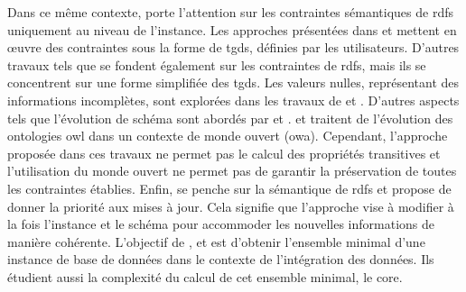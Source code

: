 Dans ce même contexte, \cite{goasdoueEfficientQueryAnswering2013} porte l'attention sur les contraintes sémantiques de \gls{rdfs} uniquement au niveau de l'instance.
Les approches présentées dans \cite{flourisFormalFoundationsRDF2013} et \cite{chabinUsingGraphGrammar2019} mettent en œuvre des contraintes sous la forme de \glspl{tgd}, définies par les utilisateurs.
D'autres travaux tels que \cite{halfeld-ferrariRDFUpdatesConstraints2017} se fondent également sur les contraintes de \gls{rdfs}, mais ils se concentrent sur une forme simplifiée des \glspl{tgd}.
Les valeurs nulles, représentant des informations incomplètes, sont explorées dans les travaux de \cite{halfeld-ferrariRDFUpdatesConstraints2017} et \cite{chabinUsingGraphGrammar2019}.
D'autres aspects tels que l'évolution de schéma sont abordés par \cite{flourisFormalFoundationsRDF2013} et \cite{goasdoueEfficientQueryAnswering2013}.
\cite{mahfoudhAdaptationOntologiesAvec2015} et \cite{mahfoudhAlgebraicGraphTransformations2015} traitent de l'évolution des ontologies \gls{owl} dans un contexte de monde ouvert (\acs{owa}).
Cependant, l'approche proposée dans ces travaux ne permet pas le calcul des propriétés transitives et l'utilisation du monde ouvert ne permet pas de garantir la préservation de toutes les contraintes établies.
Enfin, \cite{chabinUsingGraphGrammar2019} se penche sur la sémantique de \gls{rdfs} et propose de donner la priorité aux mises à jour.
Cela signifie que l'approche vise à modifier à la fois l'instance et le schéma pour accommoder les nouvelles informations de manière cohérente.
L'objectif de \cite{faginDataExchangeGetting2005}, \cite{gottlobComputingCoresData2005} et \cite{pichlerComplexityEvaluatingTuple2011} est d'obtenir l'ensemble minimal d'une instance de base de données dans le contexte de l'intégration des données.
Ils étudient aussi la complexité du calcul de cet ensemble minimal, le \gls{core}.

